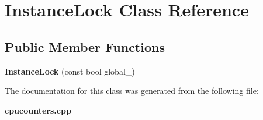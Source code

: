 \section{Instance\+Lock Class Reference}
\label{classInstanceLock}
\subsection*{Public Member Functions}
\begin{DoxyCompactItemize}
\item 
\mbox{\label{classInstanceLock_a9fa936c0a79760e8fe4e93a7bee72cb1}} 
{\bfseries Instance\+Lock} (const bool global\+\_\+)
\end{DoxyCompactItemize}


The documentation for this class was generated from the following file\+:\begin{DoxyCompactItemize}
\item 
\textbf{ cpucounters.\+cpp}\end{DoxyCompactItemize}
